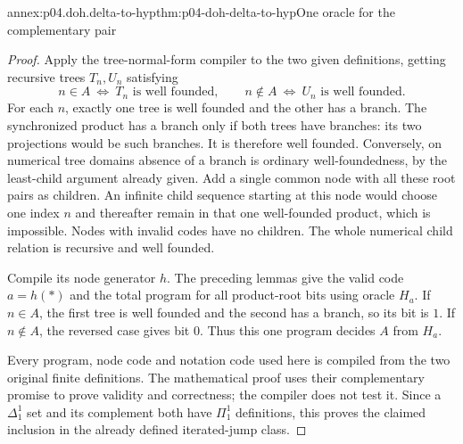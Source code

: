\begin{annexitem}{annex:p04.doh.delta-to-hyp}{thm:p04-doh-delta-to-hyp}{One oracle for the complementary pair}
\begin{proof}
Apply the tree-normal-form compiler to the two given definitions,
getting recursive trees \(T_n,U_n\) satisfying
\[
 n\in A\ \Longleftrightarrow\ T_n\text{ is well founded},\qquad
 n\notin A\ \Longleftrightarrow\ U_n\text{ is well founded}.
\]
For each \(n\), exactly one tree is well founded and the other
has a branch. The synchronized product has a branch only if both
trees have branches: its two projections would be such branches.
It is therefore well founded. Conversely, on numerical tree domains
absence of a branch is ordinary well-foundedness, by the least-child
argument already given. Add a single common node with all these
root pairs as children. An infinite child sequence starting at this
node would choose one index \(n\) and thereafter remain in that
one well-founded product, which is impossible. Nodes with invalid
codes have no children. The whole numerical child relation is
recursive and well founded.

Compile its node generator \(h\). The preceding lemmas give the
valid code \(a=h(*)\) and the total program for all product-root
bits using oracle \(H_a\). If \(n\in A\), the first tree is
well founded and the second has a branch, so its bit is \(1\).
If \(n\notin A\), the reversed case gives bit \(0\). Thus
this one program decides \(A\) from \(H_a\).

Every program, node code and notation code used here is compiled
from the two original finite definitions. The mathematical proof
uses their complementary promise to prove validity and correctness;
the compiler does not test it. Since a \(\Delta^1_1\) set and its
complement both have \(\Pi^1_1\) definitions, this proves the
claimed inclusion in the already defined iterated-jump class.
\end{proof}
\end{annexitem}

